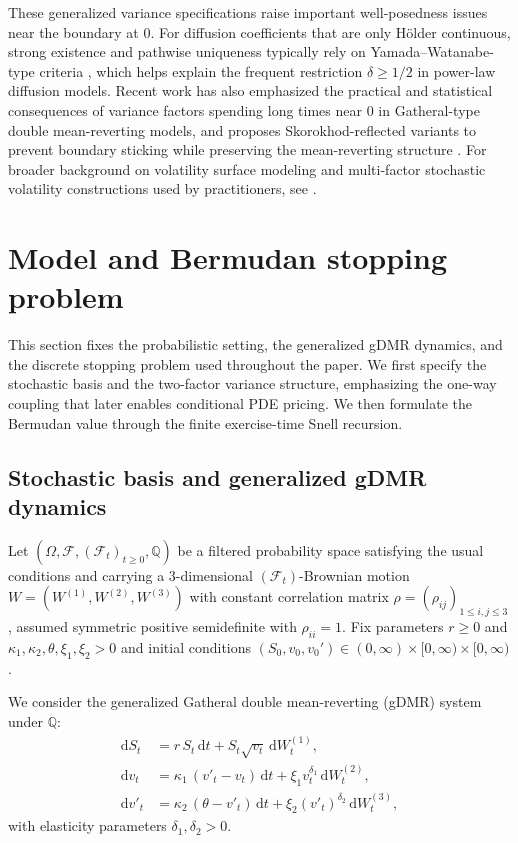 \documentclass[10pt]{article}
\theoremstyle{plain}
\theoremstyle{definition}
\theoremstyle{remark}
\newcommand{\dd}{\mathrm d}
\newcommand{\Q}{\mathbb Q}
\newcommand{\F}{\mathcal F}
\begin{document}
These generalized variance specifications raise important well-posedness issues near the boundary
at $0$. For diffusion coefficients that are only H\"older continuous, strong existence and pathwise
uniqueness typically rely on Yamada--Watanabe-type criteria \citep{yamada1971uniqueness}, which
helps explain the frequent restriction $\delta \ge 1/2$ in power-law diffusion models. Recent work
has also emphasized the practical and statistical consequences of variance factors spending long
times near $0$ in Gatheral-type double mean-reverting models, and proposes Skorokhod-reflected
variants to prevent boundary sticking while preserving the mean-reverting structure
\citep{mishura2025skorokhod}. For broader background on volatility surface modeling and
multi-factor stochastic volatility constructions used by practitioners, see \citet{gatheral2006volsurface}.



\section{Model and Bermudan stopping problem}\label{sec:model}

This section fixes the probabilistic setting, the generalized gDMR dynamics, and the discrete stopping problem used throughout the paper. We first specify the stochastic basis and the two-factor variance structure, emphasizing the one-way coupling that later enables conditional PDE pricing. We then formulate the Bermudan value through the finite exercise-time Snell recursion.

\subsection{Stochastic basis and generalized gDMR dynamics}

Let $(\Omega,\F,(\F_t)_{t\ge 0},\Q)$ be a filtered probability space satisfying the usual conditions and carrying
a $3$-dimensional $(\F_t)$-Brownian motion $W=(W^{(1)},W^{(2)},W^{(3)})$ with constant correlation matrix
$\rho=(\rho_{ij})_{1\le i,j\le 3}$, assumed symmetric positive semidefinite with $\rho_{ii}=1$.
Fix parameters $r\ge 0$ and $\kappa_1,\kappa_2,\theta,\xi_1,\xi_2>0$ and initial conditions
$(S_0,v_0,v_0')\in(0,\infty)\times[0,\infty)\times[0,\infty)$.

We consider the generalized Gatheral double mean-reverting (gDMR) system under $\Q$:
\begin{equation}\label{eq:gdmr}
\begin{aligned}
\dd S_t &= r\,S_t\,\dd t + S_t\sqrt{v_t}\,\dd W^{(1)}_t,\\
\dd v_t &= \kappa_1\,(v'_t - v_t)\,\dd t + \xi_1 v_t^{\delta_1}\,\dd W^{(2)}_t,\\
\dd v'_t &= \kappa_2\,(\theta - v'_t)\,\dd t + \xi_2 (v'_t)^{\delta_2}\,\dd W^{(3)}_t,
\end{aligned}
\end{equation}
with elasticity parameters $\delta_1,\delta_2>0$.
\end{document}
